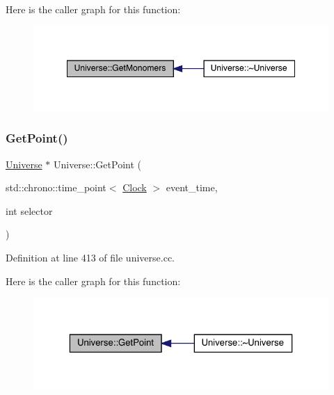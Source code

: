 Here is the caller graph for this function\+:
\nopagebreak
\begin{figure}[H]
\begin{center}
\leavevmode
\includegraphics[width=348pt]{class_universe_aca82a914e0f8bd7cd1ec80a7220f0a0e_icgraph}
\end{center}
\end{figure}
\mbox{\label{class_universe_a3774f14a13a55827a1a4eea0a404edcb}} 
\subsubsection{\texorpdfstring{Get\+Point()}{GetPoint()}}
{\footnotesize\ttfamily \hyperlink{class_universe}{Universe} $\ast$ Universe\+::\+Get\+Point (\begin{DoxyParamCaption}\item[{std\+::chrono\+::time\+\_\+point$<$ \hyperlink{universe_8h_a0ef8d951d1ca5ab3cfaf7ab4c7a6fd80}{Clock} $>$}]{event\+\_\+time,  }\item[{int}]{selector }\end{DoxyParamCaption})}



Definition at line 413 of file universe.\+cc.

Here is the caller graph for this function\+:
\nopagebreak
\begin{figure}[H]
\begin{center}
\leavevmode
\includegraphics[width=323pt]{class_universe_a3774f14a13a55827a1a4eea0a404edcb_icgraph}
\end{center}
\end{figure}
\mbox{\label{class_universe_a765c6c658b7a465cd92418690db846ae}} 
